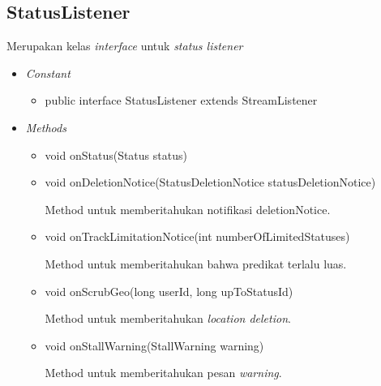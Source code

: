 	\subsection{StatusListener}
	Merupakan kelas \textit{interface} untuk \textit{status listener}
	\begin{itemize}
		\item \textit{Constant}
		
		\begin{itemize}
			\item public interface StatusListener
			extends StreamListener
		\end{itemize}
		\item \textit{Methods}
		
		\begin{itemize}
			\item void onStatus(Status status)
			\item void onDeletionNotice(StatusDeletionNotice statusDeletionNotice)
			
			Method untuk memberitahukan notifikasi deletionNotice.
			\item void onTrackLimitationNotice(int numberOfLimitedStatuses)
			
			Method untuk memberitahukan bahwa predikat terlalu luas.
			\item void onScrubGeo(long userId, long upToStatusId)
			
			Method untuk memberitahukan \textit{location deletion}.
			\item void onStallWarning(StallWarning warning)
			
			Method untuk memberitahukan pesan \textit{warning}.
		\end{itemize}
	\end{itemize}
	
